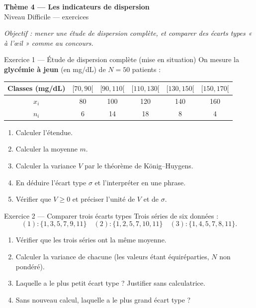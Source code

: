 \documentclass[11pt,a4paper]{article}
\newcommand{\bandeau}[2]{%
\begin{tcolorbox}[boxbase,colback=primary,colframe=primarydark,halign=center,
   before skip=2pt,after skip=12pt]
{\LARGE\bfseries\color{white} #1}\\[3pt]{\normalsize\color{white} #2}
\end{tcolorbox}}
\newcommand{\ect}{\sigma}
\begin{document}
\bandeau{Thème 4 — Les indicateurs de dispersion}{Niveau Difficile — exercices}

\noindent\textit{Objectif : mener une étude de dispersion complète, et comparer des écarts types
« à l'œil » comme au concours.}\medskip

\begin{exobox}{Exercice 1 — Étude de dispersion complète (mise en situation)}
On mesure la \textbf{glycémie à jeun} (en mg/dL) de $N=50$ patients :
\begin{center}
\renewcommand{\arraystretch}{1.2}
\begin{tabular}{|c|c|c|c|c|c|}
\hline
Classes (mg/dL) & $[70,90[$ & $[90,110[$ & $[110,130[$ & $[130,150[$ & $[150,170[$ \\\hline
$x_i$ & 80 & 100 & 120 & 140 & 160 \\\hline
$n_i$ & 6 & 14 & 18 & 8 & 4 \\\hline
\end{tabular}
\end{center}
\begin{enumerate}[label=\textbf{(\alph*)}]
  \item Calculer l'étendue.
  \item Calculer la moyenne $m$.
  \item Calculer la variance $V$ par le théorème de König--Huygens.
  \item En déduire l'écart type $\ect$ et l'interpréter en une phrase.
  \item Vérifier que $V\geqslant0$ et préciser l'unité de $V$ et de $\ect$.
\end{enumerate}
\end{exobox}

\begin{exobox}{Exercice 2 — Comparer trois écarts types}
Trois séries de six données :
\[
(1):\{1,3,5,7,9,11\}\quad (2):\{1,2,5,7,10,11\}\quad (3):\{1,4,5,7,8,11\}.
\]
\begin{enumerate}[label=\textbf{(\alph*)}]
  \item Vérifier que les trois séries ont la même moyenne.
  \item Calculer la variance de chacune (les valeurs étant équiréparties, $N$ non pondéré).
  \item Laquelle a le plus petit écart type ? Justifier sans calculatrice.
  \item Sans nouveau calcul, laquelle a le plus grand écart type ?
\end{enumerate}
\end{exobox}
\end{document}
